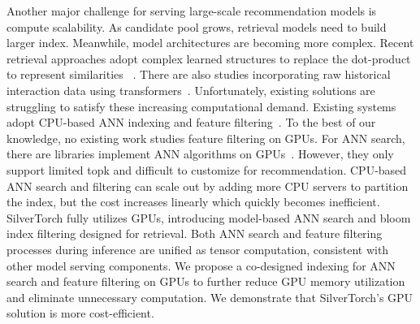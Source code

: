 Another major challenge for serving large-scale recommendation models is compute scalability. As candidate pool grows, retrieval models need to build larger index. Meanwhile, model architectures are becoming more complex. 
Recent retrieval approaches adopt complex learned structures to replace the dot-product to represent similarities ~\cite{zhai2023revisiting}. There are also studies incorporating raw historical interaction data using transformers~\cite{zhai2024actions, zhou2018deep}. Unfortunately, existing solutions are struggling to satisfy these increasing computational demand. Existing systems adopt CPU-based ANN indexing and feature filtering~\cite{jayaram2019diskann, PinterestANN, covington2016deep, huang2020embedding}. To the best of our knowledge, no existing work studies feature filtering on GPUs. For ANN search, there are libraries implement ANN algorithms on GPUs~\cite{johnson2019billion, wang2021milvus}. However, they only support limited topk and difficult to customize for recommendation. CPU-based ANN search and filtering can scale out by adding more CPU servers to partition the index, but the cost increases linearly which quickly becomes inefficient.
SilverTorch fully utilizes GPUs, introducing model-based ANN search and bloom index filtering designed for retrieval. Both ANN search and feature filtering processes during inference are unified as tensor computation, consistent with other model serving components. We propose a co-designed indexing for ANN search and feature filtering on GPUs to further reduce GPU memory utilization and eliminate unnecessary computation. We demonstrate that SilverTorch's GPU solution is more cost-efficient.

